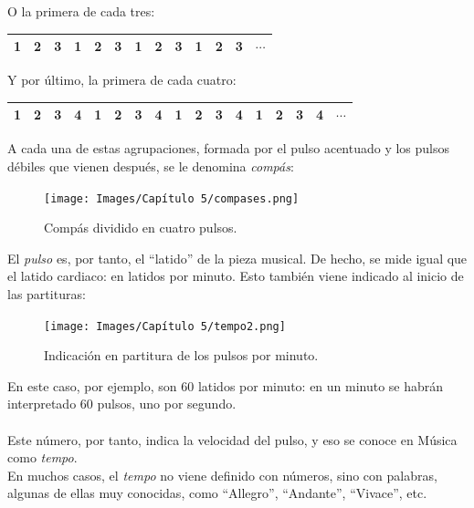 \documentclass[a4paper, openright, 11pt, titlepage]{report}
\theoremstyle{definition}\newtheorem{defin}[propo]{Definition}
\theoremstyle{definition}\newtheorem{obser}[propo]{Remark}
\theoremstyle{definition}\newtheorem{ejem}[propo]{Ejemplo}
\theoremstyle{definition}\newtheorem{algoritmo}[propo]{Algoritmo}
\begin{document}
O la primera de cada tres:
\begin{table}[H]
    \centering
    \begin{tabular}{|c|c|c|c|c|c|c|c|c|c|c|c|c|}
    \hline
        \cellcolor{acento}1 & 2 & 3 & \cellcolor{acento}1 & 2 & 3 & \cellcolor{acento}1 & 2 & 3 & \cellcolor{acento}1 & 2 & 3 & $\cdots$ \\
    \hline
    \end{tabular}
\end{table}
Y por último, la primera de cada cuatro:
\begin{table}[H]
    \centering
    \begin{tabular}{|c|c|c|c|c|c|c|c|c|c|c|c|c|c|c|c|c|}
    \hline
        \cellcolor{acento}1 & 2 & 3 & 4 & \cellcolor{acento}1 & 2 & 3 & 4 & \cellcolor{acento}1 & 2 & 3 & 4 & \cellcolor{acento}1 & 2 & 3 & 4 & $\cdots$ \\
    \hline
    \end{tabular}
\end{table}
A cada una de estas agrupaciones, formada por el pulso acentuado y los pulsos débiles que vienen después, se le denomina \textit{compás}:
\begin{figure}[H]
    \centering
    \texttt{[image: Images/Capítulo 5/compases.png]}
    \caption{Compás dividido en cuatro pulsos.}
\end{figure}
El \textit{pulso} es, por tanto, el ``latido'' de la pieza musical. De hecho, se mide igual que el latido cardiaco: en latidos por minuto. Esto también viene indicado al inicio de las partituras:
\begin{figure}[H]
    \centering
    \texttt{[image: Images/Capítulo 5/tempo2.png]}
    \caption{Indicación en partitura de los pulsos por minuto.}
\end{figure}
En este caso, por ejemplo, son 60 latidos por minuto: en un minuto se habrán interpretado 60 pulsos, uno por segundo.\\\\
Este número, por tanto, indica la velocidad del pulso, y eso se conoce en Música como \textit{tempo}.\\ En muchos casos, el \textit{tempo} no viene definido con números, sino con palabras, algunas de ellas muy conocidas, como ``Allegro'', ``Andante'', ``Vivace'', etc.
\end{document}
